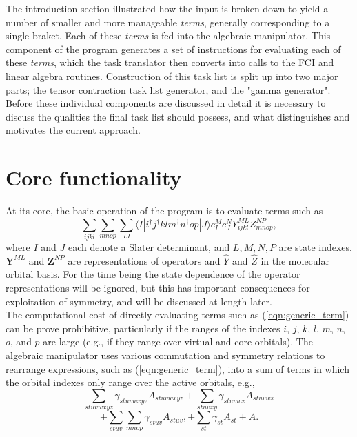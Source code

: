 \noindent The introduction section illustrated how the input is broken down to
yield a number of smaller and more manageable \emph{terms}, generally
corresponding to a single braket. Each of these \emph{terms} is fed into the algebraic
manipulator. This component of the program generates a set of instructions
for evaluating each of these \emph{terms}, which the task translator then converts into calls to the FCI
and linear algebra routines. Construction of this task list is split up into two major
parts; the tensor contraction task list generator, and the "gamma generator".
Before these individual components are discussed in detail it is
necessary to discuss the qualities the final task list should possess, and what
distinguishes and motivates the current approach. \\

\section{Core functionality}
\noindent At its core, the basic operation of the program is to evaluate terms such as 
\begin{equation}
\sum_{ijkl}\sum_{mnop} \sum_{IJ} \langle I | i^{\dagger}j^{\dagger}klm^{\dagger}n^{\dagger}op | J \rangle c^{M}_{I} c_{J}^{N} Y^{ML}_{ijkl}Z^{NP}_{mnop},
\label{eqn:generic_term}
\end{equation}
where $I$ and $J$ each denote a Slater determinant, and $L,M,N,P$ are state
indexes.  $\mathbf{Y}^{ML}$ and $\mathbf{Z}^{NP}$ are representations of
operators and $\hat{Y}$ and $\hat{Z}$ in the molecular orbital basis. For the time being
the state dependence of the operator representations will be ignored, but this has important consequences
for exploitation of symmetry, and will be discussed at length later. \\ 

\noindent The computational cost of directly evaluating terms such as (\ref{eqn:generic_term}) can be prove prohibitive,
particularly if the ranges of the indexes $i$, $j$, $k$, $l$, $m$, $n$, $o$, and $p$ are large (e.g., if they
range over virtual and core orbitals). The algebraic manipulator uses various commutation and symmetry relations
to rearrange expressions, such as (\ref{eqn:generic_term}), into a sum of terms in which
the orbital indexes only range over the active orbitals, e.g.,
\begin{equation*}
\sum_{stuvwxyz}\gamma_{stuvwxyz} A_{stuvwxyz}
+\sum_{stuvxy} \gamma_{stuvwx} A_{stuvwx}
\end{equation*}
\begin{equation}
+\sum_{stuv}\sum_{mnop} \gamma_{stuv} A_{stuv},
+\sum_{st} \gamma_{st}  A_{st}
+  A .
\label{eqn:A_list}
\end{equation}

